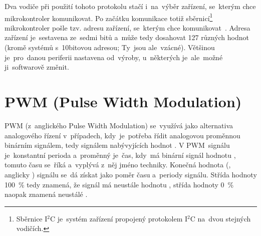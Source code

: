 Dva vodiče při použití tohoto protokolu stačí i~na~výběr zařízení, se~kterým chce mikrokontroler komunikovat.
Po začátku komunikace totiž sběrnicí\footnote{Sběrnice I$^{2}$C je~systém zařízení propojený protokolem I$^{2}$C na~dvou stejných vodičích.} mikrokontroler pošle tzv. adresu zařízení, se~kterým chce komunikovat~\cite{sparkfun-i2c}.
Adresa zařízení je~sestavena ze~sedmi bitů a~může tedy dosahovat 127 různých hodnot (kromě systémů s~10bitovou adresou; Ty~jsou ale~vzácné).
Většinou je~pro~danou periferii nastavena od~výroby, u~některých je~ale~možné ji~softwarově změnit.



\section{PWM (Pulse Width Modulation)}\label{sec:pwm}
PWM (z~anglického Pulse Width Modulation) se~využívá jako alternativa analogového řízení v~případech, kdy~je~potřeba řídit analogovou proměnnou binárním signálem, tedy signálem nabývyjících hodnot .
V PWM~signálu je~konstantní perioda a~proměnný je~čas, kdy~má binární signál hodnotu , tomuto času se~říká  a~vyplývá z~něj jméno techniky. Konečná hodnota (, anglicky ) signálu se~dá získat jako poměr času  a~periody signálu.
Střída hodnoty 100~\% tedy znamená, že signál má neustále hodnotu , střída hodnoty 0~\% naopak znamená neustálé .~\cite{pwm}\cite{wiki_pwm}

